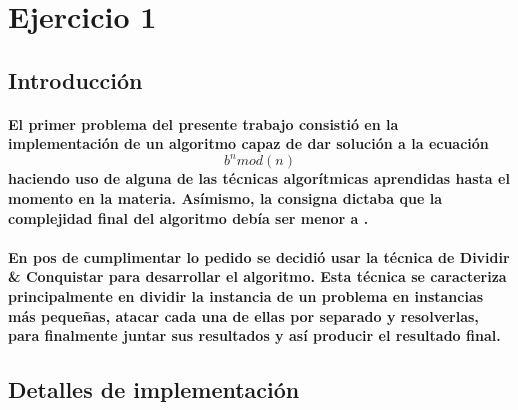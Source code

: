 \section*{Ejercicio 1}

\subsection*{Introducci\'on}

\paragraph*{El primer problema del presente trabajo consisti\'o en la implementaci\'on de un algoritmo capaz de dar soluci\'on a la ecuaci\'on \begin{equation} b^n mod (n) \end{equation} haciendo uso de alguna de las t\'ecnicas algor\'itmicas aprendidas hasta el momento en la materia. As\'imismo, la consigna dictaba que la complejidad final del algoritmo deb\'ia ser menor a .}
\paragraph*{En pos de cumplimentar lo pedido se decidi\'o usar la t\'ecnica de Dividir \& Conquistar para desarrollar el algoritmo. Esta t\'ecnica se caracteriza principalmente en dividir la instancia de un problema en instancias m\'as peque\~nas, atacar cada una de ellas por separado y resolverlas, para finalmente juntar sus resultados y as\'i producir el resultado final.}

\subsection*{Detalles de implementaci\'on}
\paragraph*{}
